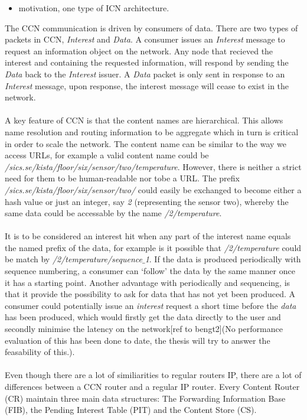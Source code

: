 \begin{itemize}
\item motivation, one type of ICN architecture. 
\end{itemize}
The CCN communication is driven by consumers of data. There are two types of packets in CCN, \textit{Interest} and \textit{Data}. A consumer issues an \textit{Interest} message to request an information object on the network. Any node that recieved the interest and containing the requested information, will respond by sending the \textit{Data} back to the \textit{Interest} issuer. A \textit{Data} packet is only sent in response to an \textit{Interest} message, upon response, the interest message will cease to exist in the network.
\\\\
A key feature of CCN is that the content names are hierarchical. This allows name resolution and routing information to be aggregate which in turn is critical in order to scale the network. The content name can be similar to the way we access URLs, for example a valid content name could be \textit{/sics.se/kista/floor/six/sensor/two/temperature}. However, there is neither a strict need for them to be human-readable nor tobe a URL. The prefix \textit{/sics.se/kista/floor/six/sensor/two/} could easily be exchanged to become either a hash value or just an integer, say \textit{2} (representing the sensor two), whereby the same data could be accessable by the name \textit{/2/temperature}.
\\\\
It is to be considered an interest hit when any part of the interest name equals the named prefix of the data, for example is it possible that \textit{/2/temperature} could be match by \textit{/2/temperature/sequence$\_$1}. If the data is produced periodically with sequence numbering, a consumer can `follow' the data by the same manner once it has a starting point. Another advantage with periodically and sequencing, is that it provide the possibility to ask for data that has not yet been produced. A consumer could potentially issue an \textit{interest} request a short time before the \textit{data} has been produced, which would firstly get the data directly to the user and secondly minimise the latency on the network[ref to bengt2](No performance evaluation of this has been done to date, the thesis will try to answer the feasability of this.). 
\\\\
Even though there are a lot of similiarities to regular routers IP, there are a lot of differences between a CCN router and a regular IP router.
Every Content Router (CR) maintain three main data structures: The Forwarding Information Base (FIB), the Pending Interest Table (PIT) and the Content Store (CS).

